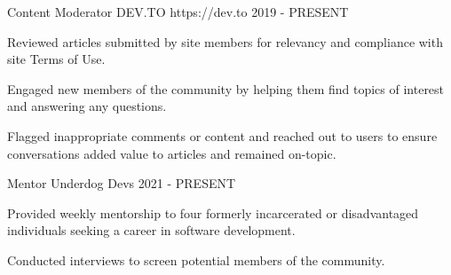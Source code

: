 

\begin {cventries}
  \cventry
    {Content Moderator} %
    {DEV.TO} %
    {https://dev.to} %
    {2019 - PRESENT} %
    {
      \begin{cvitems} %
        \item {Reviewed articles submitted by site members for relevancy and compliance with site Terms of Use.}
        \item {Engaged new members of the community by helping them find topics of interest and answering any questions.}
        \item {Flagged inappropriate comments or content and reached out to users to ensure conversations added value to articles and remained on-topic.}
      \end{cvitems}
    }
  \cventry
    {Mentor} %
    {Underdog Devs} %
    {} %
    {2021 - PRESENT} %
    {
      \begin{cvitems} %
        \item {Provided weekly mentorship to four formerly incarcerated or disadvantaged individuals seeking a career in software development.}
        \item {Conducted interviews to screen potential members of the community.}
      \end{cvitems}
    }

\end{cventries}
